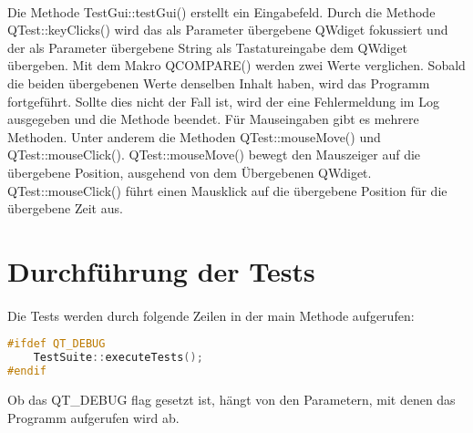 		\paragraph{}Die Methode TestGui::testGui() erstellt ein Eingabefeld. Durch die Methode QTest::keyClicks() wird das als Parameter übergebene QWdiget fokussiert und der als Parameter übergebene String als Tastatureingabe dem QWdiget übergeben. Mit dem Makro QCOMPARE() werden zwei Werte verglichen. Sobald die beiden übergebenen Werte denselben Inhalt haben, wird das Programm fortgeführt. Sollte dies nicht der Fall ist, wird der eine Fehlermeldung im Log ausgegeben und die Methode beendet. Für Mauseingaben gibt es mehrere Methoden. Unter anderem die Methoden QTest::mouseMove() und QTest::mouseClick(). QTest::mouseMove() bewegt den Mauszeiger auf die übergebene Position, ausgehend von dem Übergebenen QWdiget. QTest::mouseClick() führt einen Mausklick auf die übergebene Position für die übergebene Zeit aus.
		
		
		\section{Durchführung der Tests}
		\paragraph{} Die Tests werden durch folgende Zeilen in der main Methode aufgerufen:
		\begin{lstlisting}[language=C++, caption=main.cpp]
#ifdef QT_DEBUG
    TestSuite::executeTests();
#endif
		\end{lstlisting}
		Ob das QT\_DEBUG flag gesetzt ist, hängt von den Parametern, mit denen das Programm aufgerufen wird ab.
		
